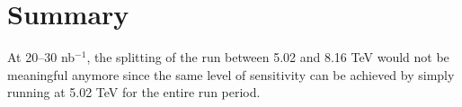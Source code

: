 \section*{Summary}

At 20--30 nb$^{-1}$, the splitting of
the run between 5.02 and 8.16 TeV would not be meaningful anymore since the same level of 
sensitivity can be achieved by simply running at 5.02 TeV for the entire run period.